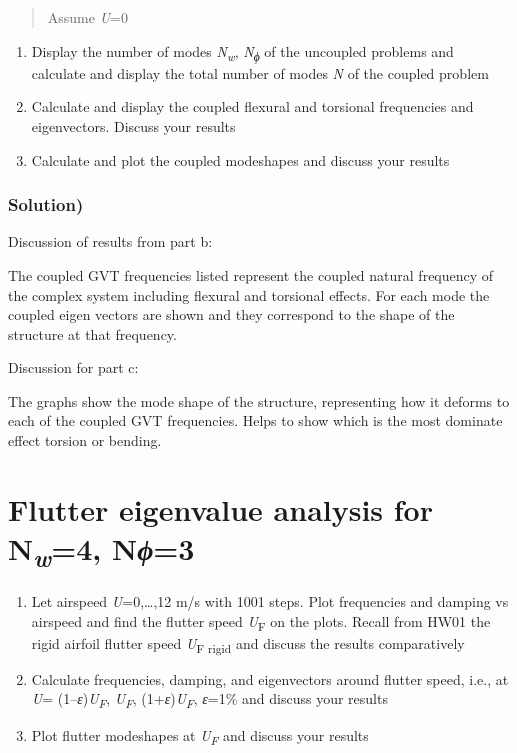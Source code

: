 \documentclass[11pt]{article}
\begin{document}
\begin{quote}
Assume \emph{U}=0
\end{quote}

\begin{enumerate}
\def\labelenumi{(\alph{enumi})}
\item
  Display the number of modes \emph{N\textsubscript{w}},
  \emph{N\textsubscript{ϕ}} of the uncoupled problems and calculate and
  display the total number of modes \emph{N} of the coupled problem
\item
  Calculate and display the coupled flexural and torsional frequencies
  and eigenvectors. Discuss your results
\item
  Calculate and plot the coupled modeshapes and discuss your results
\end{enumerate}

\subsubsection{Solution)}\label{solution-3}

Discussion of results from part b:

The coupled GVT frequencies listed represent the coupled natural
frequency of the complex system including flexural and torsional
effects. For each mode the coupled eigen vectors are shown and they
correspond to the shape of the structure at that frequency.

Discussion for part c:

The graphs show the mode shape of the structure, representing how it
deforms to each of the coupled GVT frequencies. Helps to show which is
the most dominate effect torsion or bending.

\section{\texorpdfstring{Flutter eigenvalue analysis for
N\emph{\textsubscript{w}}=4,
N\emph{ϕ}=3}{Flutter eigenvalue analysis for Nw=4, Nϕ=3}}\label{flutter-eigenvalue-analysis-for-nw4-nux3d53}

\begin{enumerate}
\def\labelenumi{(\alph{enumi})}
\item
  Let airspeed \emph{U}=0,\ldots,12 m/s with 1001 steps. Plot
  frequencies and damping vs airspeed and find the flutter speed
  \emph{U}\textsubscript{F} on the plots. Recall from HW01 the rigid
  airfoil flutter speed \emph{U}\textsubscript{F rigid} and discuss the
  results comparatively
\item
  Calculate frequencies, damping, and eigenvectors around flutter speed,
  i.e., at \emph{U}= (1--\emph{ε})\emph{U\textsubscript{F}},
  \emph{U\textsubscript{F}}, (1+\emph{ε})\emph{U\textsubscript{F}},
  \emph{ε}=1\% and discuss your results
\item
  Plot flutter modeshapes at \emph{U\textsubscript{F}} and discuss your
  results
\end{enumerate}
\end{document}
